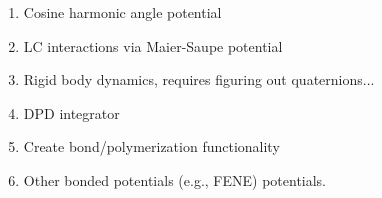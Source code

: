 \documentclass[12pt]{article}
\begin{document}
\begin{enumerate}
	
	
	\item
	Cosine harmonic angle potential

	\item
	LC interactions via Maier-Saupe potential
	
	\item
	Rigid body dynamics, requires figuring out quaternions...
	
	\item
	DPD integrator
		
	\item
	Create bond/polymerization functionality
	
	\item
	Other bonded potentials (e.g., FENE) potentials.
	
	
\end{enumerate}
\end{document}
